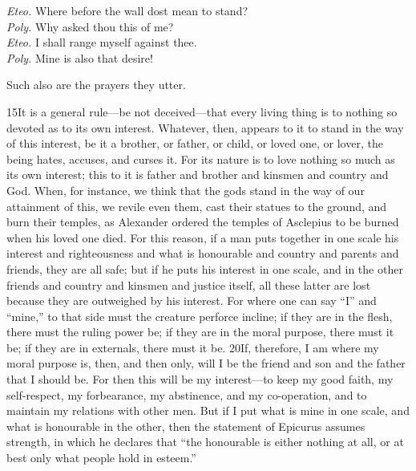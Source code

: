 \emph{Eteo.} Where before the wall dost mean to stand?\\
\emph{Poly.} Why asked thou this of me?\\
\emph{Eteo.} I shall range myself against thee.\\
\emph{Poly.} Mine is also that desire!

Such also are the prayers they utter.

15It is a general rule—be not deceived—that every living thing is to nothing so devoted as to its own interest. Whatever, then, appears to it to stand in the way of this interest, be it a brother, or father, or child, or loved one, or lover, the being hates, accuses, and curses it. For its nature is to love nothing so much as its own interest; this to it is father and brother and kinsmen and country and God. When, for instance, we think that the gods stand in the way of our attainment of this, we revile even them, cast their statues to the ground, and burn their temples, as Alexander ordered the temples of Asclepius to be burned when his loved one died. For this reason, if a man puts together in one scale his interest and righteousness and what is honourable and country and parents and friends, they are all safe; but if he puts his interest in one scale, and in the other friends and country and kinsmen and justice itself, all these latter are lost because they are outweighed by his interest. For where one can say ``I'' and ``mine,'' to that side must the creature perforce incline; if they are in the flesh, there must the ruling power be; if they are in the moral purpose, there must it be; if they are in externals, there must it be. 20If, therefore, I am where my moral purpose is, then, and then only, will I be the friend and son and the father that I should be. For then this will be my interest—to keep my good faith, my self-respect, my forbearance, my abstinence, and my co-operation, and to maintain my relations with other men. But if I put what is mine in one scale, and what is honourable in the other, then the statement of Epicurus assumes strength, in which he declares that ``the honourable is either nothing at all, or at best only what people hold in esteem.''

